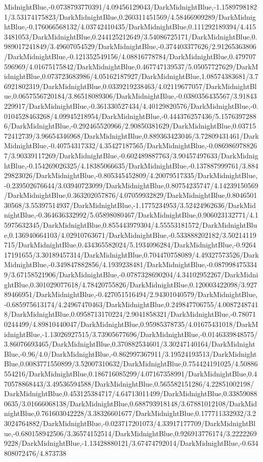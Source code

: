 {\begin{tikzternal}
MidnightBlue,-0.0738793770391/4.09456129043/DarkMidnightBlue,-1.15897981821/3.53174175823/DarkMidnightBlue,0.260311451569/4.58466909289/DarkMidnightBlue,-0.176066568132/4.03742410435/DarkMidnightBlue,0.111292189394/4.4153481053/DarkMidnightBlue,0.244125212649/3.54086725171/DarkMidnightBlue,0.989017241849/3.49607054529/DarkMidnightBlue,-0.374403377626/2.91265363806/DarkMidnightBlue,-0.121352549156/4.08816778784/DarkMidnightBlue,0.479707596969/4.01675175842/DarkMidnightBlue,0.467747139537/5.05057727629/DarkMidnightBlue,0.073723683986/4.05162187927/DarkMidnightBlue,1.08574383681/3.76921802319/DarkMidnightBlue,0.0339219238463/4.02119677057/DarkMidnightBlue,0.0657556720184/3.86518089306/DarkMidnightBlue,-0.0380356435567/3.91843229917/DarkMidnightBlue,-0.361330527434/4.40129820576/DarkMidnightBlue,-0.0104528463268/4.09945218954/DarkMidnightBlue,-0.444376257436/5.15763972886/DarkMidnightBlue,-0.292465520966/2.90850381629/DarkMidnightBlue,0.0371572412739/3.96654346968/DarkMidnightBlue,0.889363423046/3.72809431461/DarkMidnightBlue,-0.40754317332/4.35427187565/DarkMidnightBlue,-0.0869869788267/3.90339117269/DarkMidnightBlue,-0.602489887763/3.90457497633/DarkMidnightBlue,-0.154269026325/4.18385066635/DarkMidnightBlue,-0.137887999761/3.88429823026/DarkMidnightBlue,-0.805345452809/4.20079517335/DarkMidnightBlue,-0.239502676644/3.03940723099/DarkMidnightBlue,0.80754235747/4.14239150569/DarkMidnightBlue,0.363202057876/4.07059932829/DarkMidnightBlue,0.804650130568/3.55397514937/DarkMidnightBlue,-1.1775234953/3.52424962636/DarkMidnightBlue,-0.364636332992/5.05898080467/DarkMidnightBlue,0.906023132771/4.15975632345/DarkMidnightBlue,0.855443979304/4.55553181572/DarkMidnightBlue,0.136940664103/4.02910763671/DarkMidnightBlue,-0.533888202182/3.50214119715/DarkMidnightBlue,0.434365582024/5.1934096284/DarkMidnightBlue,-0.926417191655/3.30189457314/DarkMidnightBlue,0.704470758089/4.49327573526/DarkMidnightBlue,-0.349847882856/4.1939238481/DarkMidnightBlue,-0.0879984753349/3.67158521906/DarkMidnightBlue,-0.0787328690204/4.34102952267/DarkMidnightBlue,0.301029077618/4.78420755826/DarkMidnightBlue,0.120003422098/3.92789466951/DarkMidnightBlue,-0.427051516494/2.94301040579/DarkMidnightBlue,-0.685975613174/4.24967470463/DarkMidnightBlue,0.249847706755/4.00872487418/DarkMidnightBlue,0.0958713170224/2.9041858321/DarkMidnightBlue,-0.780710244499/4.89810440047/DarkMidnightBlue,0.95985378735/4.01675431018/DarkMidnightBlue,-1.13026927515/3.73905677696/DarkMidnightBlue,-0.0146339848575/3.86076693465/DarkMidnightBlue,0.370882534601/3.30247140164/DarkMidnightBlue,-0.96/4.0/DarkMidnightBlue,-0.862997367911/3.19524193513/DarkMidnightBlue,0.0083771550899/3.52007310632/DarkMidnightBlue,0.754424191025/4.50886554216/DarkMidnightBlue,0.186716085299/4.07167358991/DarkMidnightBlue,0.470578868443/3.49536594588/DarkMidnightBlue,0.565582151286/4.22851002198/DarkMidnightBlue,0.453125384717/4.64713011499/DarkMidnightBlue,0.338590880635/3.01666068138/DarkMidnightBlue,0.688793918148/3.67881012108/DarkMidnightBlue,0.761603042228/3.38326601677/DarkMidnightBlue,0.177711332932/3.23024764882/DarkMidnightBlue,-0.023717201073/4.33917177709/DarkMidnightBlue,-0.680158942506/3.36574152514/DarkMidnightBlue,0.926913776174/3.22222699228/DarkMidnightBlue,-1.13428880121/3.67474792014/DarkMidnightBlue,-0.634808072476/4.873738
\end{tikzternal}}
